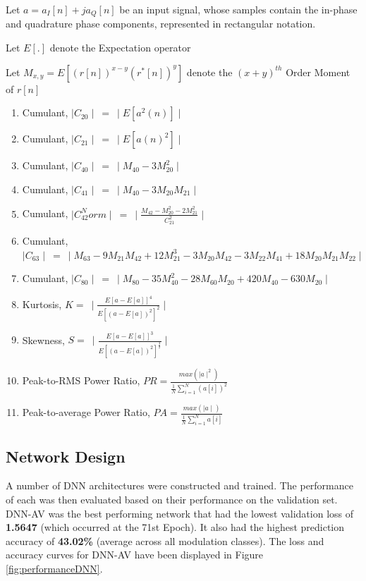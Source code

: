 \documentclass[journal,onecolumn]{IEEEtran}
\begin{document}
Let $a=a_I[n]+ja_Q[n]$ be an input signal, whose samples contain the in-phase and quadrature phase components, represented in rectangular notation.

Let $E[.]$ denote the Expectation operator

Let $M_{x,y}=E[(r[n])^{x-y}(r^*[n])^y]$ denote the $(x+y)^{th}$ Order Moment of $r[n]$ 

\begin{enumerate}
\setlength{\itemsep}{1.2\baselineskip}
\item Cumulant, $\mid C_{20} \mid\ =\ \mid E\left[a^{2}\left(n\right)\right]\mid$
\item Cumulant, $\mid C_{21} \mid\ =\ \mid E\left[a\left(n\right)^{2}\right]\mid$
\item Cumulant, $\mid C_{40} \mid\ =\ \mid M_{40}-3M_{20}^2\mid$
\item Cumulant, $\mid C_{41} \mid\ =\ \mid M_{40}-3M_{20}M_{21}\mid$
\item Cumulant, $\mid C_{42}^Norm \mid\ =\ \mid \frac{M_{42}-M_{20}^2-2M_{21}^2}{C_{21}^2}\mid$
\item Cumulant, $\mid C_{63} \mid\ =\ \mid M_{63}-9M_{21}M_{42}+12M_{21}^3-3M_{20}M_{42}-3M_{22}M_{41}+18M_{20}M_{21}M_{22} \mid$
\item Cumulant, $\mid C_{80} \mid\ =\ \mid M_{80}-35M_{40}^2-28M_{60}M_{20}+420M_{40}-630M_{20} \mid$
\item Kurtosis, $K=\ \mid\frac{E\left[a-E\left[a\right]\right]^4}{E\left[\left(a-E\left[a\right]\right)^2\right]^{2}}\mid$ 
\item Skewness, $S=\ \mid\frac{E\left[a-E\left[a\right]\right]^3}{E\left[\left(a-E\left[a\right]\right)^2\right]^{\frac{3}{2}}}\mid$
\item Peak-to-RMS Power Ratio, $PR = \frac{max\left(\mid a \mid^2\right)}{\frac{1}{N}\sum_{i=1}^{N}\left(a[i]\right)^2}$
\item Peak-to-average Power Ratio, $PA = \frac{max\left(\mid a \mid\right)}{\frac{1}{N}\sum_{i=1}^{N}a[i]}$

\end{enumerate}

\subsection{Network Design}

A number of DNN architectures were constructed and trained. The performance of each was then evaluated based on their performance on the validation set. DNN-AV was the best performing network that had the lowest validation loss of \textbf{1.5647} (which occurred at the 71st Epoch). It also had the highest prediction accuracy of \textbf{43.02\%} (average across all modulation classes). The loss and accuracy curves for DNN-AV have been displayed in Figure \ref{fig:performanceDNN}. 
\end{document}
